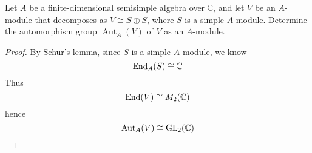 \begin{prob}[S2016-Q6, F2006-Q6, F2008-Q6]
    Let \( A \) be a finite-dimensional semisimple algebra over \( \mathbb{C} \), and let \( V \) be an \( A \)-module that decomposes as \( V \cong S \oplus S \), where \( S \) is a simple \( A \)-module. Determine the automorphism group \( \operatorname{Aut}_A(V) \) of \( V \) as an \( A \)-module.
\end{prob}
\begin{proof}
   By Schur's lemma, since $S$ is a simple $A$-module, we know 
   \begin{equation*}
        \text{End}_A(S)\cong\mathbb{C}
   \end{equation*}
   Thus 
   \begin{equation*}
        \text{End}(V)\cong M_2(\mathbb{C})
   \end{equation*}
   hence 
   \begin{equation*}
        \text{Aut}_A(V)\cong \text{GL}_2(\mathbb{C})
   \end{equation*}
\end{proof}



